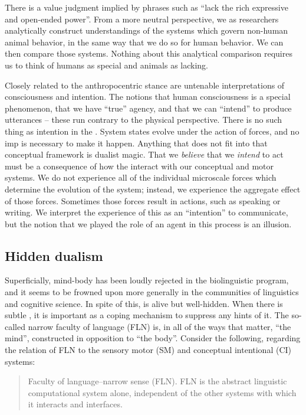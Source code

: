   There is a value judgment implied by phrases such as “lack the rich expressive and open-ended power”. From a more neutral perspective, we as researchers analytically construct understandings of the systems which govern non-human animal behavior, in the same way that we do so for human behavior. We can then compare those systems. Nothing about this analytical comparison requires us to think of humans as special and animals as lacking.

  Closely related to the anthropocentric stance are untenable interpretations of consciousness and intention. The notions that human consciousness is a special phenomenon, that we have “true” agency, and that we can “intend” to produce utterances -- these run contrary to the physical perspective. There is no such thing as intention in the . System states evolve under the action of forces, and no imp is necessary to make it happen. Anything that does not fit into that conceptual framework is dualist magic. That we \textit{believe} that we \textit{intend} to act must be a consequence of how the  interact with our conceptual and motor systems. We do not experience all of the individual microscale forces which determine the evolution of the system; instead, we experience the aggregate effect of those forces. Sometimes those forces result in actions, such as speaking or writing. We interpret the experience of this as an “intention” to communicate, but the notion that we played the role of an agent in this process is an illusion.

\subsection{Hidden dualism}

Superficially, mind-body  has been loudly rejected in the biolinguistic program, and it seems to be frowned upon more generally in the communities of linguistics and cognitive science. In spite of this,  is alive but well-hidden. When there is subtle , it is important as a coping mechanism to suppress any hints of it. The so-called narrow faculty of language (FLN) is, in all of the ways that matter, “the mind”, constructed in opposition to “the body”. Consider the following, regarding the relation of FLN to the sensory motor (SM) and conceptual intentional (CI) systems:

\begin{quote}
Faculty of language--narrow sense (FLN). FLN is the abstract linguistic computational system alone, independent of the other systems with which it interacts and interfaces. \citep{HauserEtAl2002}
\end{quote}

